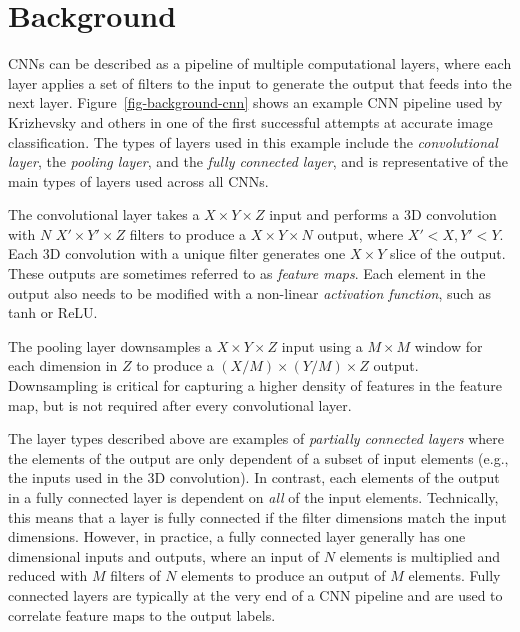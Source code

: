 
\section{Background}
\label{sec-background}



CNNs can be described as a pipeline of multiple computational layers,
where each layer applies a set of filters to the input to generate the
output that feeds into the next layer. Figure~\ref{fig-background-cnn}
shows an example CNN pipeline used by Krizhevsky and others in one of the
first successful attempts at accurate image classification. The types of
layers used in this example include the \emph{convolutional layer}, the
\emph{pooling layer}, and the \emph{fully connected layer}, and is
representative of the main types of layers used across all CNNs.

The convolutional layer takes a $X\times Y\times Z$ input and performs a 3D
convolution with $N$ $X'\times Y'\times Z$ filters to produce a
$X\times Y\times N$ output, where $X' < X, Y' < Y$. Each 3D convolution
with a unique filter generates one $X\times Y$ slice of the output. These
outputs are sometimes referred to as \emph{feature maps}. Each element in
the output also needs to be modified with a non-linear \emph{activation
  function}, such as tanh or ReLU.

The pooling layer downsamples a $X\times Y\times Z$ input using a
$M\times M$ window for each dimension in $Z$ to produce a
$(X/M)\times (Y/M)\times Z$ output. Downsampling is critical for capturing
a higher density of features in the feature map, but is not required
after every convolutional layer.

The layer types described above are examples of \emph{partially connected
  layers} where the elements of the output are only dependent of a subset
of input elements (e.g., the inputs used in the 3D convolution). In
contrast, each elements of the output in a fully connected layer is
dependent on \emph{all} of the input elements. Technically, this means
that a layer is fully connected if the filter dimensions match the input
dimensions. However, in practice, a fully connected layer generally has
one dimensional inputs and outputs, where an input of $N$ elements is
multiplied and reduced with $M$ filters of $N$ elements to produce an
output of $M$ elements. Fully connected layers are typically at the very
end of a CNN pipeline and are used to correlate feature maps to the
output labels.

